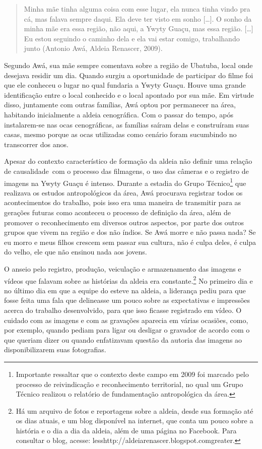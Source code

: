 {{\begin{quotation}
Minha mãe tinha alguma coisa com esse lugar, ela nunca tinha vindo pra
cá, mas falava sempre daqui. Ela deve ter visto em sonho [\ldots{}]. O sonho
da minha mãe era essa região, não aqui, a Ywyty Guaçu, mas essa região.
[\ldots{}] Eu estou seguindo o caminho dela e ela vai estar comigo,
trabalhando junto (Antonio Awá, Aldeia Renascer, 2009).
\end{quotation}

Segundo Awá, sua mãe sempre comentava sobre a região de Ubatuba, local
onde desejava residir um dia. Quando surgiu a oportunidade de
participar do filme foi que ele conheceu o lugar no qual fundaria a
Ywyty Guaçu. Houve uma grande identificação entre o local conhecido e o
local apontado por sua mãe. Em virtude disso, juntamente com outras
famílias, Awá optou por permanecer na área, habitando inicialmente a
aldeia cenográfica. Com o passar do tempo, após instalarem-se nas ocas
cenográficas, as famílias saíram delas e construíram suas casas, mesmo
porque as ocas utilizadas como cenário foram sucumbindo no transcorrer
dos anos. 

Apesar do contexto característico de formação da aldeia não definir uma
relação de causalidade~com o processo das filmagens, o uso das câmeras
e o registro de imagens na Ywyty Guaçu é intenso. Durante a estadia do
Grupo Técnico\footnote{Importante ressaltar que o contexto deste campo
em 2009 foi marcado pelo processo de reivindicação e reconhecimento
territorial, no qual um Grupo Técnico realizou o relatório de
fundamentação antropológica da área.} que realizava os estudos
antropológicos da área, Awá procurava registrar todos os acontecimentos
do trabalho, pois isso era uma maneira de transmitir para as gerações
futuras como aconteceu o processo de definição da área, além de
promover o reconhecimento em diversos outros aspectos, por parte dos
outros grupos que vivem na região e dos não índios. Se Awá morre e não
passa nada? Se eu morro e meus filhos crescem sem passar sua cultura,
não é culpa deles, é culpa do velho, ele que não ensinou nada aos
jovens. 

O anseio pelo registro, produção, veiculação e armazenamento das imagens
e vídeos que falavam sobre as histórias da aldeia era
constante.\footnote{Há um arquivo de fotos e reportagens sobre a
aldeia, desde sua formação até os dias atuais, e um blog disponível na
internet, que conta um pouco sobre a história e o dia a dia da aldeia,
além de uma página no Facebook. Para consultar o blog, acesse:
{less}http://aldeiarenascer.blogspot.com{greater}.} No
primeiro dia e no último dia em que a equipe do  esteve na aldeia, a
liderança pediu para que fosse feita uma fala que delineasse um pouco
sobre as expectativas e impressões acerca do trabalho desenvolvido,
para que isso ficasse registrado em vídeo. O cuidado com as imagens e
com as gravações aparecia em várias ocasiões, como, por exemplo, quando
pediam para ligar ou desligar o gravador de acordo com o que queriam
dizer ou quando enfatizavam questão da autoria das imagens ao
disponibilizarem suas fotografias.

}}
